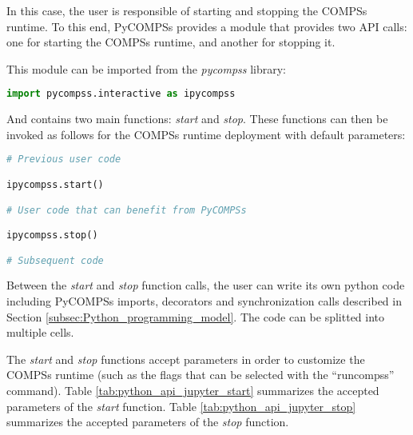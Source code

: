In this case, the user is responsible of starting and stopping the COMPSs runtime.
To this end, PyCOMPSs provides a module that provides two API calls: one for starting the COMPSs runtime, and another for stopping it.

This module can be imported from the {\it pycompss} library:

\begin{lstlisting}[language=python]
import pycompss.interactive as ipycompss
\end{lstlisting}

And contains two main functions: {\it start} and {\it stop}. These functions can then be invoked as follows for the COMPSs runtime deployment with default parameters:

\begin{lstlisting}[language=python]
# Previous user code

ipycompss.start()

# User code that can benefit from PyCOMPSs

ipycompss.stop()

# Subsequent code
\end{lstlisting}

Between the {\it start} and {\it stop} function calls, the user can write its own python code including PyCOMPSs imports, decorators and synchronization calls described in Section \ref{subsec:Python_programming_model}.
The code can be splitted into multiple cells.

The {\it start} and {\it stop} functions accept parameters in order to customize the COMPSs runtime (such as the flags that can be selected with the ``runcompss'' command).
Table \ref{tab:python_api_jupyter_start} summarizes the accepted parameters of the {\it start} function.
Table \ref{tab:python_api_jupyter_stop} summarizes the accepted parameters of the {\it stop} function.

